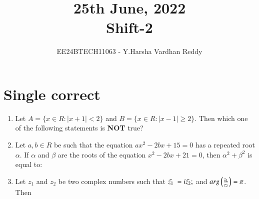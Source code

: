 \documentclass[journal,,12pt,onecolumn]{IEEEtran}
\theoremstyle{remark}
\begin{document}

\vspace{3cm}

\title{25th June, 2022\\Shift-2}
\author{EE24BTECH11063 - Y.Harsha Vardhan Reddy}
\maketitle

\bigskip

\renewcommand{\thefigure}{\theenumi}
\renewcommand{\thetable}{\theenumi}

\section*{Single correct}
\begin{enumerate}
    \item Let $A=\{x\in R : |x+1| < 2\}$ and $B=\{x\in R : |x-1| \ge 2\}$. Then which one of the following statements is \textbf{NOT} true?
    \begin{enumerate}
    \begin{multicols}{2}
    \item $A \cap B=(-3,-1]$
    \item $A \cup B=R-[1,3)$
    \end{multicols}
        \end{enumerate}
        \bigskip
        \item Let $a,b \in R$ be such that the equation $ax^2-2bx+15=0$ has a repeated root $\alpha$. If $\alpha$ and $\beta$ are the roots of the equation $x^2-2bx+21=0$, then $\alpha^2+\beta^2$ is equal to:
        \begin{enumerate}
        \end{enumerate}
        \bigskip
\item Let $z_1$ and $z_2$ be two complex numbers such that  $\Bar{z_1}\;=i\Bar{z_2};$ and $arg\left(\frac{z_1}{z_2}\right)=\pi$. Then

\end{enumerate}
\end{document}
